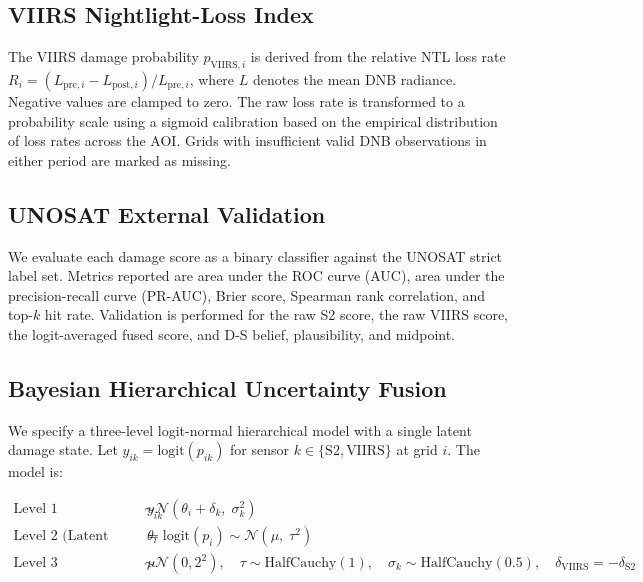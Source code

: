 \documentclass[wcp]{jmlr}
\begin{document}
\subsection{VIIRS Nightlight-Loss Index}

The VIIRS damage probability $p_{\text{VIIRS},i}$ is derived from the
relative NTL loss rate $R_i = (L_{\text{pre},i} -
L_{\text{post},i})/L_{\text{pre},i}$, where $L$ denotes the mean DNB
radiance. Negative values are clamped to zero. The raw loss rate is
transformed to a probability scale using a sigmoid calibration based on the
empirical distribution of loss rates across the AOI. Grids with insufficient
valid DNB observations in either period are marked as missing.

\subsection{UNOSAT External Validation}

We evaluate each damage score as a binary classifier against the UNOSAT
strict label set. Metrics reported are area under the ROC curve (AUC), area
under the precision-recall curve (PR-AUC), Brier score, Spearman rank
correlation, and top-$k$ hit rate. Validation is performed for the raw S2
score, the raw VIIRS score, the logit-averaged fused score, and D-S belief,
plausibility, and midpoint.

\subsection{Bayesian Hierarchical Uncertainty Fusion}\label{sec:bayes}

We specify a three-level logit-normal hierarchical model with a single
latent damage state. Let $y_{ik} = \text{logit}(p_{ik})$ for sensor
$k \in \{\text{S2}, \text{VIIRS}\}$ at grid $i$. The model is:

\begin{align}
\text{Level 1 (Observation):}\quad
  y_{ik} &\sim \mathcal{N}(\theta_i + \delta_k,\; \sigma_k^2) \label{eq:L1}\\
\text{Level 2 (Latent state):}\quad
  \theta_i &= \text{logit}(p_i) \sim \mathcal{N}(\mu,\; \tau^2) \label{eq:L2}\\
\text{Level 3 (Hyperpriors):}\quad
  \mu &\sim \mathcal{N}(0, 2^2),\quad
  \tau \sim \text{HalfCauchy}(1),\quad
  \sigma_k \sim \text{HalfCauchy}(0.5),\quad
  \delta_{\text{VIIRS}} = -\delta_{\text{S2}} \label{eq:L3}
\end{align}
\end{document}

